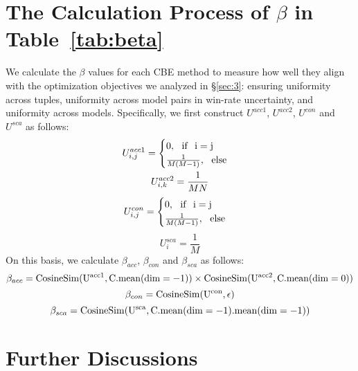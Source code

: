 \section{The Calculation Process of $\beta$ in Table~\ref{tab:beta}}
\label{app:beta}
We calculate the $\beta$ values for each CBE method to measure how well they align with the optimization objectives we analyzed in \S\ref{sec:3}: ensuring uniformity across tuples, uniformity across model pairs in win-rate uncertainty, and uniformity across models.
Specifically, we first construct $U^{acc1}$, $U^{acc2}$, $U^{con}$ and $U^{sca}$ as follows:
\begin{equation}
\begin{gathered}
    U^{acc1}_{i,j} = \begin{cases} 0, \ \ \rm{if}\ \ i=j\\
    \frac{1}{M(M-1)}, \ \ \rm{else}
    \end{cases}\\
    U^{acc2}_{i,k} = \frac{1}{MN}
\end{gathered}
\end{equation}
\begin{equation}
    U^{con}_{i,j} = \begin{cases} 0, \ \ \rm{if}\ \ i=j\\
    \frac{1}{M(M-1)}, \ \ \rm{else}
    \end{cases}
\end{equation}
\begin{equation}
    U^{sca}_{i} = \frac{1}{M}
\end{equation}
On this basis, we calculate $\beta_{acc}$, $\beta_{con}$ and $\beta_{sca}$ as follows:
\begin{equation}
    \beta_{acc} = \rm{CosineSim}(U^{acc1},C.\rm{mean}(\rm{dim}=-1))\times \rm{CosineSim}(U^{acc2},C.\rm{mean}(\rm{dim}=0))
\end{equation}
\begin{equation}
    \beta_{con} = \rm{CosineSim}(U^{con},\epsilon)
\end{equation}
\begin{equation}
    \beta_{sca} = \rm{CosineSim}(U^{sca},C.\rm{mean}(\rm{dim}=-1).\rm{mean}(\rm{dim}=-1))
\end{equation}

\section{Further Discussions}
